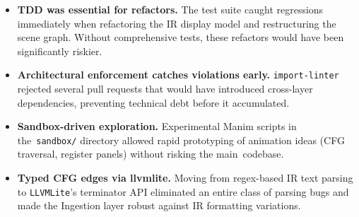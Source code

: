 \begin{itemize}
    \item \textbf{TDD was essential for refactors.} The test suite caught regressions immediately when refactoring the IR display model and restructuring the scene graph. Without comprehensive tests, these refactors would have been significantly riskier.

    \item \textbf{Architectural enforcement catches violations early.} \texttt{import-linter} rejected several pull requests that would have introduced cross-layer dependencies, preventing technical debt before it accumulated.

    \item \textbf{Sandbox-driven exploration.} Experimental Manim scripts in the~\texttt{sandbox/} directory allowed rapid prototyping of animation ideas (CFG traversal, register panels) without risking the main~codebase.

    \item \textbf{Typed CFG edges via llvmlite.} Moving from regex-based IR text parsing to \texttt{LLVMLite}'s terminator API eliminated an entire class of parsing bugs and made the Ingestion layer robust against IR formatting variations.
\end{itemize}
